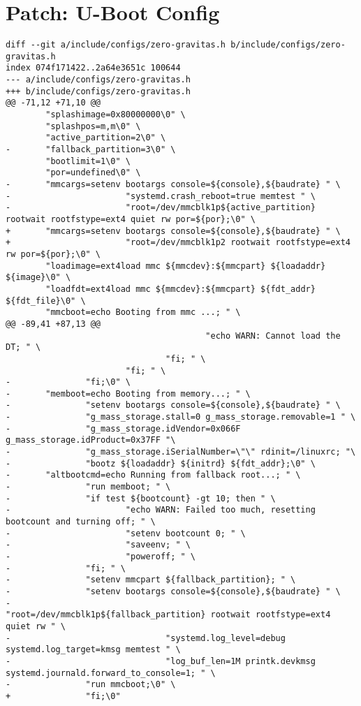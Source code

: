\documentclass{memoir}
\begin{document}
\chapter{Patch: U-Boot Config}
\label{ch:ubootdiff}
\begin{verbatim}
diff --git a/include/configs/zero-gravitas.h b/include/configs/zero-gravitas.h
index 074f171422..2a64e3651c 100644
--- a/include/configs/zero-gravitas.h
+++ b/include/configs/zero-gravitas.h
@@ -71,12 +71,10 @@
        "splashimage=0x80000000\0" \
        "splashpos=m,m\0" \
        "active_partition=2\0" \
-       "fallback_partition=3\0" \
        "bootlimit=1\0" \
        "por=undefined\0" \
-       "mmcargs=setenv bootargs console=${console},${baudrate} " \
-                       "systemd.crash_reboot=true memtest " \
-                       "root=/dev/mmcblk1p${active_partition} rootwait rootfstype=ext4 quiet rw por=${por};\0" \
+       "mmcargs=setenv bootargs console=${console},${baudrate} " \
+                       "root=/dev/mmcblk1p2 rootwait rootfstype=ext4 rw por=${por};\0" \
        "loadimage=ext4load mmc ${mmcdev}:${mmcpart} ${loadaddr} ${image}\0" \
        "loadfdt=ext4load mmc ${mmcdev}:${mmcpart} ${fdt_addr} ${fdt_file}\0" \
        "mmcboot=echo Booting from mmc ...; " \
@@ -89,41 +87,13 @@
                                        "echo WARN: Cannot load the DT; " \
                                "fi; " \
                        "fi; " \
-               "fi;\0" \
-       "memboot=echo Booting from memory...; " \
-               "setenv bootargs console=${console},${baudrate} " \
-               "g_mass_storage.stall=0 g_mass_storage.removable=1 " \
-               "g_mass_storage.idVendor=0x066F g_mass_storage.idProduct=0x37FF "\
-               "g_mass_storage.iSerialNumber=\"\" rdinit=/linuxrc; "\
-               "bootz ${loadaddr} ${initrd} ${fdt_addr};\0" \
-       "altbootcmd=echo Running from fallback root...; " \
-               "run memboot; " \
-               "if test ${bootcount} -gt 10; then " \
-                       "echo WARN: Failed too much, resetting bootcount and turning off; " \
-                       "setenv bootcount 0; " \
-                       "saveenv; " \
-                       "poweroff; " \
-               "fi; " \
-               "setenv mmcpart ${fallback_partition}; " \
-               "setenv bootargs console=${console},${baudrate} " \
-                               "root=/dev/mmcblk1p${fallback_partition} rootwait rootfstype=ext4 quiet rw " \
-                               "systemd.log_level=debug systemd.log_target=kmsg memtest " \
-                               "log_buf_len=1M printk.devkmsg systemd.journald.forward_to_console=1; " \
-               "run mmcboot;\0" \
+               "fi;\0"
 

\end{verbatim}
\end{document}

